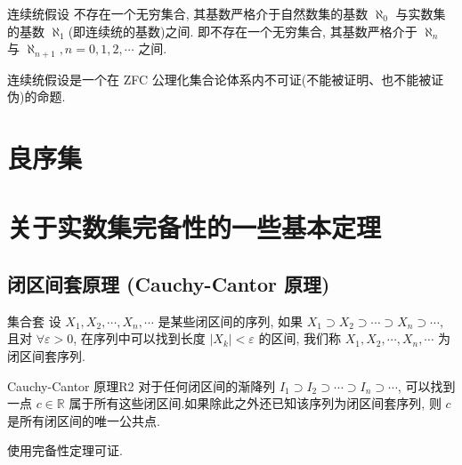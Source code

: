 \documentclass[cn,toc=twocol]{elegantbook}
\newcommand{\R}{\mathbb{R}}
\begin{document}
\begin{proposition}{连续统假设}
不存在一个无穷集合, 其基数严格介于自然数集的基数 $\aleph_0$ 与实数集的基数 $\aleph_1$(即连续统的基数)之间. 即不存在一个无穷集合, 其基数严格介于 $\aleph_n$ 与 $\aleph_{n+1},  n=0,  1, 2,  \cdots $ 之间.
\end{proposition}

连续统假设是一个在 ZFC 公理化集合论体系内不可证(不能被证明、也不能被证伪)的命题.
\section{良序集}






\section{关于实数集完备性的一些基本定理}

\subsection{闭区间套原理 (Cauchy-Cantor 原理)}

\begin{definition}{集合套}
设 $X_1, X_2, \cdots, X_n, \cdots$ 是某些闭区间的序列, 如果 $X_1\supset X_2\supset \cdots \supset X_n \supset\cdots$, 且对 $\forall \varepsilon > 0$, 在序列中可以找到长度 $|X_k| < \varepsilon$ 的区间, 我们称 $X_1, X_2, \cdots, X_n, \cdots$ 为闭区间套序列.
\end{definition}

\begin{theorem}{Cauchy-Cantor 原理}{R2}
	对于任何闭区间的渐降列 $I_1\supset I_2\supset \cdots \supset I_n \supset\cdots$, 可以找到一点 $c\in\R$ 属于所有这些闭区间.如果除此之外还已知该序列为闭区间套序列, 则 $c$ 是所有闭区间的唯一公共点.
\end{theorem}

\begin{idea*}
使用完备性定理可证.	
\end{idea*}
\end{document}
